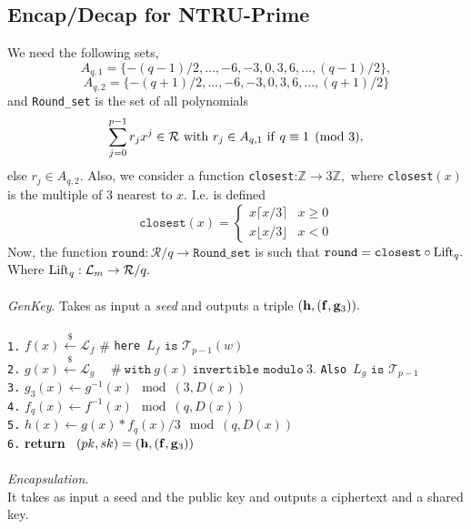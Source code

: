 \documentclass{amsart}
\numberwithin{equation}{section}
\begin{document}
 \subsection{Encap/Decap for NTRU-Prime} We need the following sets,
 $$A_{q,1}=\{-(q-1)/2,...,-6,-3,0,3,6,...,(q-1)/2\},$$ 
 $$A_{q,2}=\{-(q+1)/2,...,-6,-3,0,3,6,...,(q+1)/2\}$$ and
  {\texttt{Round\_set}} is the set of all polynomials 
 $$\sum_{j=0}^{p-1} r_jx^j\in {\mathcal{R}}\ {\rm{with}}\ r_j\in A_{q,1}\ {\rm{if}}\ q\equiv 1 \pmod{3},$$ else $r_j\in A_{q,2}.$
 Also, we consider a function {\texttt{closest}}:${\mathbb{Z}}\rightarrow 3{\mathbb{Z}},$ where {\texttt{closest}}$(x)$ is the  multiple of $3$ nearest to $x.$ I.e. is defined  
\[ {\texttt{closest}}(x) = \begin{cases} 
      x\lceil x/3 \rceil & x\geq 0 \\
      x\lfloor x/3 \rfloor & x <0 
   \end{cases}
\] 
 Now, the function ${\texttt{round}}:{\mathcal{R}}/q\rightarrow {\texttt{Round\_set}}$ is such that ${\texttt{round}} = {\texttt{closest}}\circ {\rm{Lift}}_q.$
Where ${\rm{Lift}}_q:{\mathcal{L}}_m\rightarrow {\mathcal{R}}/q.$
\ \\\\
{\it GenKey}. 
Takes as input a {\it{seed}} and outputs a triple $({\bf h},({\bf f},{\bf g}_3)).$\\\\
\texttt{1.}  $f(x)\xleftarrow{\$} {\mathcal{L}}_f $  \hspace{10pt} \# {\texttt{here}}\ $L_f \texttt{ is } {\mathcal{T}}_{p-1}(w)$\\
\texttt{2.}  $g(x)\xleftarrow{\$} {\mathcal{L}}_g\hspace{10pt}\ \ \# \ {\texttt{with}}\ g(x)\  \texttt{invertible modulo}\ 3.$  {\texttt{Also}}\ $L_g \texttt{ is } {\mathcal{T}}_{p-1}$\\
\texttt{3.}  $g_3(x)\leftarrow g^{-1}(x)\mod{(3,D(x))}$\\
\texttt{4.} $f_q(x)\leftarrow f^{-1}(x)\mod{(q,D(x))}$\\
\texttt{5.}  $h(x) \leftarrow g(x)*f_q(x)/3\mod{(q,D(x))}$\\ 
\texttt{6.} {\bf return} \ $(pk,sk)=({\bf h},({\bf f},{\bf g}_3))$\ \\\\
{\it Encapsulation}.
\ \\
It takes as input a seed and the public key and outputs a ciphertext and a shared key.\\\\
\end{document}
